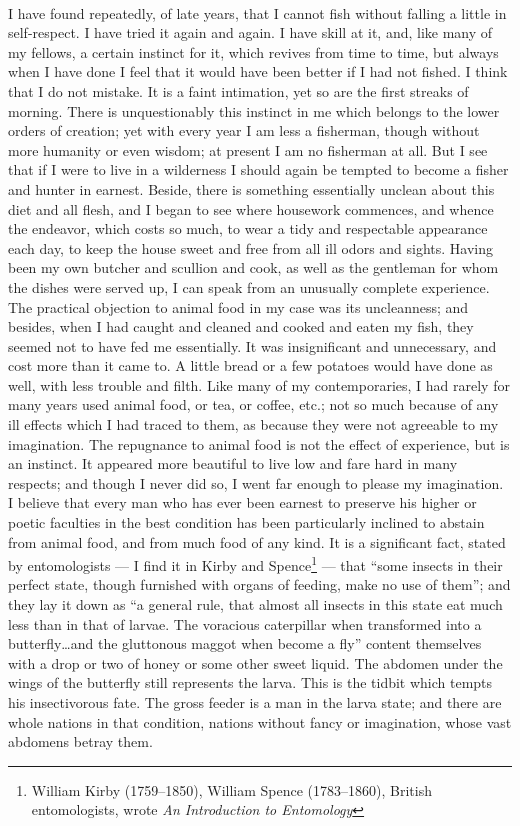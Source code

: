 \documentclass[letterpaper,12pt]{article}
\begin{document}
\paragraph{} I have found repeatedly, of late years, that I cannot fish without
falling a little in self-respect. I have tried it again and again. I have skill
at it, and, like many of my fellows, a certain instinct for it, which revives
from time to time, but always when I have done I feel that it would have been
better if I had not fished. I think that I do not mistake. It is a faint
intimation, yet so are the first streaks of morning. There is unquestionably
this instinct in me which belongs to the lower orders of creation; yet with
every year I am less a fisherman, though without more humanity or even wisdom;
at present I am no fisherman at all. But I see that if I were to live in a
wilderness I should again be tempted to become a fisher and hunter in earnest.
Beside, there is something essentially unclean about this diet and all flesh,
and I began to see where housework commences, and whence the endeavor, which
costs so much, to wear a tidy and respectable appearance each day, to keep the
house sweet and free from all ill odors and sights. Having been my own butcher
and scullion and cook, as well as the gentleman for whom the dishes were served
up, I can speak from an unusually complete experience. The practical objection
to animal food in my case was its uncleanness; and besides, when I had caught
and cleaned and cooked and eaten my fish, they seemed not to have fed me
essentially. It was insignificant and unnecessary, and cost more than it came
to. A little bread or a few potatoes would have done as well, with less trouble
and filth. Like many of my contemporaries, I had rarely for many years used
animal food, or tea, or coffee, etc.; not so much because of any ill effects
which I had traced to them, as because they were not agreeable to my
imagination. The repugnance to animal food is not the effect of experience, but
is an instinct. It appeared more beautiful to live low and fare hard in many
respects; and though I never did so, I went far enough to please my imagination.
I believe that every man who has ever been earnest to preserve his higher or
poetic faculties in the best condition has been particularly inclined to abstain
from animal food, and from much food of any kind. It is a significant fact,
stated by entomologists --- I find it in Kirby and Spence\footnote{William Kirby
    (1759--1850), William Spence (1783--1860), British entomologists, wrote
    \textit{An Introduction to Entomology}} --- that \enquote{some insects in
    their perfect state, though furnished with organs of feeding, make no use of
    them}; and they lay it down as \enquote{a general rule, that almost all
    insects in this state eat much less than in that of larvae. The voracious
    caterpillar when transformed into a butterfly\dots and the gluttonous maggot
    when become a fly} content themselves with a drop or two of honey or some
other sweet liquid. The abdomen under the wings of the butterfly still
represents the larva. This is the tidbit which tempts his insectivorous fate.
The gross feeder is a man in the larva state; and there are whole nations in
that condition, nations without fancy or imagination, whose vast abdomens betray
them.
\end{document}

